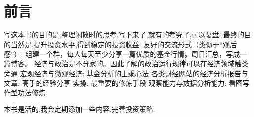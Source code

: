\chapter*{前言}

写这本书的目的是,整理闲散时的思考.写下来了,就有的考究了,可以复盘.
最终的目的当然是,提升投资水平,得到稳定的投资收益.
友好的交流形式（类似于“观后感”）: 组建一个群，每人每天至少分享一篇优质的基金行情。周日汇总，写成一篇博客。
经济与政治是不分家的。因此了解的政治运行规律可以在经济领域触类旁通
宏观经济与微观经济: 基金分析的上乘心法
各类财经网站的经济分析报告与文章: 高手的经验分享
实操: 最重要的修炼手段
观察能力与数据分析能力: 看图写作型功法修炼

本书是活的,我会定期添加一些内容,完善投资策略.
